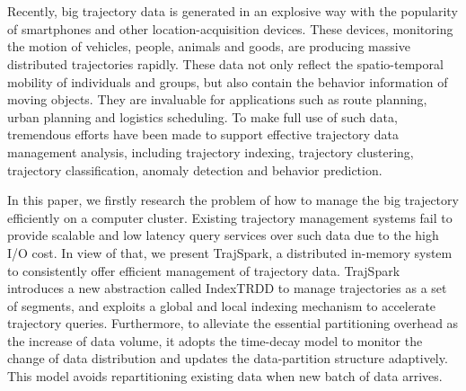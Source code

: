 \newpage
\vspace{-1cm}
\chapter*{}
\vspace{-0.5cm}

Recently, big trajectory data  is generated in an explosive way with the popularity of smartphones and other location-acquisition devices.
 These devices, monitoring the motion of vehicles, people, animals and goods, are producing massive distributed trajectories rapidly. 
 These data not only reflect the spatio-temporal mobility of individuals and groups, but  also contain the behavior information of moving objects. They are invaluable for applications such as  route planning, urban planning and logistics scheduling.
 To make full use of such data, tremendous efforts have been made to support effective trajectory data management analysis, including trajectory indexing, trajectory clustering, trajectory classification,  anomaly detection and  behavior prediction.
 
 In this paper, we firstly research the problem of how to manage the big trajectory efficiently on a computer cluster. Existing trajectory management systems fail to provide scalable and low latency query services over such data due to the high I/O cost. In view of that, we present TrajSpark, a distributed in-memory system to consistently offer efficient management of trajectory data. TrajSpark introduces a new abstraction called IndexTRDD to manage trajectories as a set of segments, and exploits a global and local indexing mechanism to accelerate trajectory queries. Furthermore, to alleviate the essential partitioning overhead as the increase of data volume, it adopts the time-decay model to monitor the change of data distribution and updates the data-partition structure adaptively.
 This model avoids repartitioning existing data when new batch of data arrives.
 
